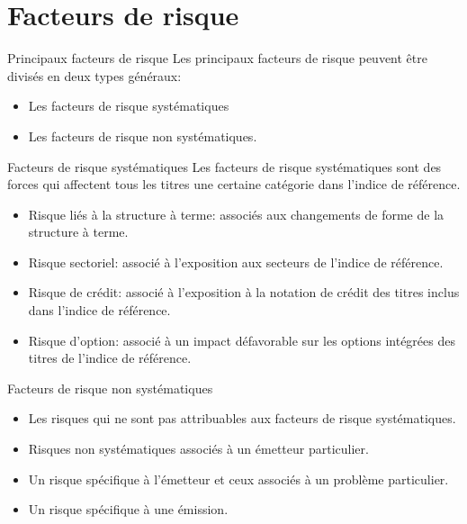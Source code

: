 \documentclass[10pt,a4paper]{beamer}
\begin{document}
\section{Facteurs de risque}
\begin{frame}{Principaux facteurs de risque}
Les principaux facteurs de risque peuvent être divisés en deux types généraux: 
\begin{itemize}[label=\bullet]
\item Les facteurs de risque systématiques
\item Les facteurs de risque non systématiques.
\end{itemize}
\end{frame}

\begin{frame}{Facteurs de risque systématiques}
Les facteurs de risque systématiques sont des forces qui affectent tous les titres
une certaine catégorie dans l'indice de référence.
\begin{itemize}[label=\bullet]
\item Risque liés à la structure à terme: associés aux changements de forme de la structure 
à terme.
\item Risque sectoriel: associé à l'exposition aux secteurs de l'indice de référence.
\item Risque de crédit: associé à l'exposition à la notation de crédit des titres inclus dans l'indice de référence.
\item Risque d'option: associé à un impact défavorable sur les options intégrées des titres de l'indice de référence.
\end{itemize}
\end{frame}

\begin{frame}{Facteurs de risque non systématiques}

\begin{itemize}[label=\bullet]
\item Les risques qui ne sont pas attribuables aux facteurs de risque systématiques.
\item Risques non systématiques associés à un émetteur particulier.
\item Un risque spécifique à l'émetteur et ceux associés à un problème particulier.
\item Un risque spécifique à une émission.
\end{itemize}
\end{frame}
\end{document}
